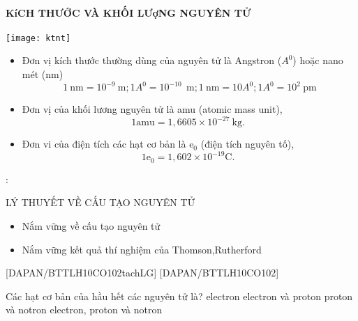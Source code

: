 \paragraph{KíCH THƯỚC VÀ KHỐI LƯợNG NGUYÊN TỬ}
\begin{center}
	\texttt{[image: ktnt]}\\
	\label{fig:hinh7}
\end{center}
\begin{notegsnd}
	\begin{itemize}
		\item Đơn vị kích thước thường dùng của nguyên tử là Angstron ($ A^0 $) hoặc nano mét (nm)			
		$$1 \mathrm{~nm}=10^{-9}~\mathrm{m} ; 1 A^0=10^{-10}~\mathrm{~m} ; 1 \mathrm{~nm}=10 A^0; 1 A^0=10^{2}~\mathrm{pm}$$
		\begin{center}
		\end{center}
		\item Đơn vị của khối lương nguyên tử là amu (atomic mass unit),
		$$
		1 \mathrm{amu}=1,6605 \times 10^{-27} \mathrm{~kg} \text {. }
		$$
		\item Đơn vi của điện tích các hạt cơ bản là $\mathrm{e}_0$ (điện tích nguyên tố),
		$$
		1 \mathrm{e}_0=1,602 \times 10^{-19} \mathrm{C} \text {. }
		$$
	\end{itemize}
\end{notegsnd}
\newpage
\vspace*{3pt}

:
\begin{dangntd}{LÝ THUYẾT VỀ CẤU TẠO NGUYÊN TỬ}
	\begin{itemize}
		\item Nắm vững về cấu tạo nguyên tử
		\item Nắm vững kết quả thí nghiệm của Thomson,Rutherford
	\end{itemize}
\end{dangntd}
[DAPAN/BTTLH10CO102tachLG]
[DAPAN/BTTLH10CO102]
\begin{ex}[1]
	Các hạt cơ bản của hầu hết các nguyên tử là?
	\choice
	{%
		electron
	}
	{%
		electron và proton
	}
	{%
		proton và notron
	}
	{%
		\True electron, proton và notron
	}
	\sodongkeex[5]
\end{ex}


